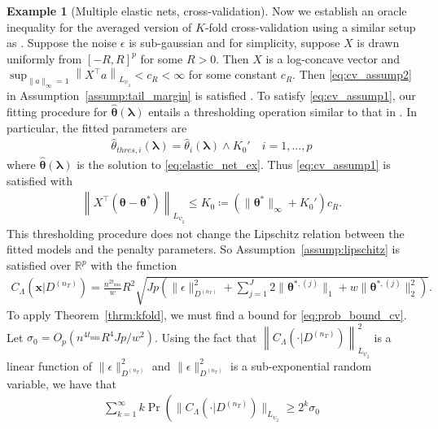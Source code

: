 \documentclass[12pt]{article} %
\theoremstyle{definition}
\newtheorem{example}{Example}
\begin{document}
\begin{example}[Multiple elastic nets, cross-validation]
	Now we establish an oracle inequality for the averaged version of $K$-fold cross-validation using a similar setup as \citet{lecue2012oracle}.
	Suppose the noise $\epsilon$ is sub-gaussian and for simplicity, suppose $X$ is drawn uniformly from $[-R, R]^p$ for some $R > 0$.
	Then $X$ is a log-concave vector and
	$
	\sup_{\|a\|_\infty = 1} \left\| X^\top a \right \|_{L_{\psi_2}} < c_R < \infty
	$
	for some constant $c_R$.
	Then \eqref{eq:cv_assump2} in Assumption~\ref{assump:tail_margin} is satisfied \citep{lecue2012oracle}.
	To satisfy \eqref{eq:cv_assump1}, our fitting procedure for $\hat{\boldsymbol{\theta}}(\boldsymbol{\lambda})$ entails a thresholding operation similar to that in \citet{lecue2012oracle}.
	In particular, the fitted parameters are
	\begin{align}
	\hat{{\theta}}_{thres, i}(\boldsymbol{\lambda})
	= \hat{{\theta}}_{i}(\boldsymbol{\lambda}) \wedge K_0'
	\quad i = 1,...,p
	\end{align}
	where $\hat{\boldsymbol{\theta}}(\boldsymbol{\lambda})$ is the solution to \eqref{eq:elastic_net_ex}.
	Thus \eqref{eq:cv_assump1} is satisfied with
	\begin{align}
	\left\|
	X^\top (\boldsymbol{\theta} - \boldsymbol{\theta}^*)
	\right \|_{L_{\psi_2}}
	\le
	K_0 \coloneqq 
	(\|\boldsymbol{\theta}^*\|_\infty + K_0')
	c_R.
	\end{align}
	This thresholding procedure does not change the Lipschitz relation between the fitted models and the penalty parameters.
	So Assumption~\ref{assump:lipschitz} is satisfied over $\mathbb{R}^p$ with the function
	\begin{align}
	C_\Lambda(\boldsymbol{x} | D^{(n_T)})
	=
	\frac{n^{2t_{\min}}}{w}
	R^2 \sqrt{
		J p
		\left(
		\|\epsilon\|_{D^{(n_T)}}^{2}
		+\sum_{j=1}^J
		2 \|\boldsymbol{\theta}^{*,(j)}\|_1
		+ w\|\boldsymbol{\theta}^{*,(j)}\|_2^2
		\right)
	}.
	\label{eq:elastic_lipschitz_cv}
	\end{align}
	\noindent
	To apply Theorem~\ref{thrm:kfold}, we must find a bound for \eqref{eq:prob_bound_cv}.
	Let $\sigma_0 = O_p(n^{4t_{\min}}R^4Jp/w^2 )$.
	Using the fact that
	$\left \| C_\Lambda(\cdot | D^{(n_T)}) \right \|_{L_{\psi_2}}^2$ is a linear function of $\|\epsilon\|_{D^{(n_T)}}^2$ and $\|\epsilon\|_{D^{(n_T)}}^2$ is a sub-exponential random variable, we have that
	\begin{align}
	\sum_{k = 1}^\infty k \Pr \left (
	\| C_\Lambda(\cdot | D^{(n_T)}) \|_{L_{\psi_2}}
	\ge 2^k \sigma_0

\end{align}
\end{example}
\end{document}
